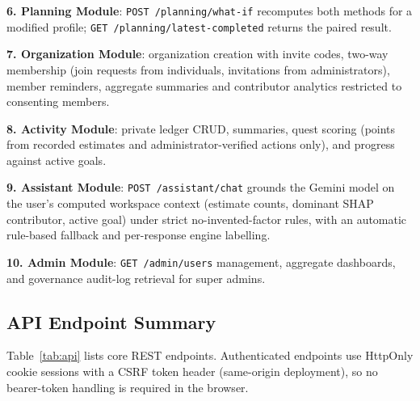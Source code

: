 \documentclass[conference]{IEEEtran}
\begin{document}
\textbf{6. Planning Module}: \texttt{POST /planning/what-if} recomputes both methods for a modified profile; \texttt{GET /planning/latest-completed} returns the paired result.

\textbf{7. Organization Module}: organization creation with invite codes, two-way membership (join requests from individuals, invitations from administrators), member reminders, aggregate summaries and contributor analytics restricted to consenting members.

\textbf{8. Activity Module}: private ledger CRUD, summaries, quest scoring (points from recorded estimates and administrator-verified actions only), and progress against active goals.

\textbf{9. Assistant Module}: \texttt{POST /assistant/chat} grounds the Gemini model on the user's computed workspace context (estimate counts, dominant SHAP contributor, active goal) under strict no-invented-factor rules, with an automatic rule-based fallback and per-response engine labelling.

\textbf{10. Admin Module}: \texttt{GET /admin/users} management, aggregate dashboards, and governance audit-log retrieval for super admins.

\subsection{API Endpoint Summary}

Table~\ref{tab:api} lists core REST endpoints. Authenticated endpoints use HttpOnly cookie sessions with a CSRF token header (same-origin deployment), so no bearer-token handling is required in the browser.
\end{document}
